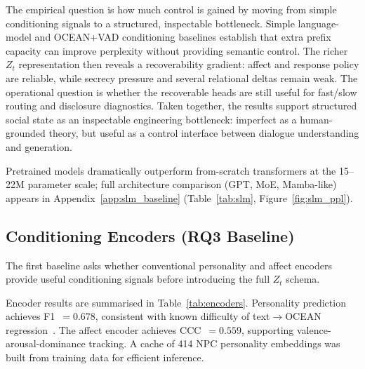 \documentclass[11pt]{article}
\begin{document}
The empirical question is how much control is gained by moving from simple conditioning signals to a structured, inspectable bottleneck.
Simple language-model and OCEAN+VAD conditioning baselines establish that extra prefix capacity can improve perplexity without providing semantic control.
The richer $Z_t$ representation then reveals a recoverability gradient: affect and response policy are reliable, while secrecy pressure and several relational deltas remain weak.
The operational question is whether the recoverable heads are still useful for fast/slow routing and disclosure diagnostics.
Taken together, the results support structured social state as an inspectable engineering bottleneck: imperfect as a human-grounded theory, but useful as a control interface between dialogue understanding and generation.

Pretrained models dramatically outperform from-scratch transformers at the 15--22M parameter scale; full architecture comparison (GPT, MoE, Mamba-like) appears in Appendix~\ref{app:slm_baseline} (Table~\ref{tab:slm}, Figure~\ref{fig:slm_ppl}).

\subsection{Conditioning Encoders (RQ3 Baseline)}

The first baseline asks whether conventional personality and affect encoders provide useful conditioning signals before introducing the full $Z_t$ schema.

\begin{table}[t]
\centering
\caption{Conditioning encoder evaluation.}
\label{tab:encoders}
\small
{}
\end{table}

Encoder results are summarised in Table~\ref{tab:encoders}. Personality prediction achieves F1~$=0.678$, consistent with known difficulty of text$\to$OCEAN regression~\cite{mairesse2007using}.
The affect encoder achieves CCC~$=0.559$, supporting valence-arousal-dominance tracking.
A cache of 414 NPC personality embeddings was built from training data for efficient inference.
\end{document}
